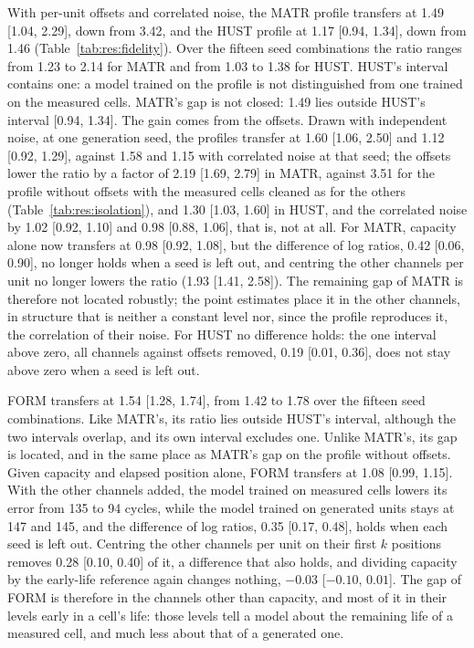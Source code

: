 \documentclass{article}
\begin{document}
With per-unit offsets and correlated noise, the MATR profile transfers at 1.49 [1.04, 2.29], down from 3.42, and the HUST profile at 1.17 [0.94, 1.34], down from 1.46 (Table~\ref{tab:res:fidelity}). Over the fifteen seed combinations the ratio ranges from 1.23 to 2.14 for MATR and from 1.03 to 1.38 for HUST. HUST's interval contains one: a model trained on the profile is not distinguished from one trained on the measured cells. MATR's gap is not closed: 1.49 lies outside HUST's interval [0.94, 1.34]. The gain comes from the offsets. Drawn with independent noise, at one generation seed, the profiles transfer at 1.60 [1.06, 2.50] and 1.12 [0.92, 1.29], against 1.58 and 1.15 with correlated noise at that seed; the offsets lower the ratio by a factor of 2.19 [1.69, 2.79] in MATR, against 3.51 for the profile without offsets with the measured cells cleaned as for the others (Table~\ref{tab:res:isolation}), and 1.30 [1.03, 1.60] in HUST, and the correlated noise by 1.02 [0.92, 1.10] and 0.98 [0.88, 1.06], that is, not at all. For MATR, capacity alone now transfers at 0.98 [0.92, 1.08], but the difference of log ratios, 0.42 [0.06, 0.90], no longer holds when a seed is left out, and centring the other channels per unit no longer lowers the ratio (1.93 [1.41, 2.58]). The remaining gap of MATR is therefore not located robustly; the point estimates place it in the other channels, in structure that is neither a constant level nor, since the profile reproduces it, the correlation of their noise. For HUST no difference holds: the one interval above zero, all channels against offsets removed, 0.19 [0.01, 0.36], does not stay above zero when a seed is left out.

FORM transfers at 1.54 [1.28, 1.74], from 1.42 to 1.78 over the fifteen seed combinations. Like MATR's, its ratio lies outside HUST's interval, although the two intervals overlap, and its own interval excludes one. Unlike MATR's, its gap is located, and in the same place as MATR's gap on the profile without offsets. Given capacity and elapsed position alone, FORM transfers at 1.08 [0.99, 1.15]. With the other channels added, the model trained on measured cells lowers its error from 135 to 94 cycles, while the model trained on generated units stays at 147 and 145, and the difference of log ratios, 0.35 [0.17, 0.48], holds when each seed is left out. Centring the other channels per unit on their first $k$ positions removes 0.28 [0.10, 0.40] of it, a difference that also holds, and dividing capacity by the early-life reference again changes nothing, $-0.03$ [$-0.10$, $0.01$]. The gap of FORM is therefore in the channels other than capacity, and most of it in their levels early in a cell's life: those levels tell a model about the remaining life of a measured cell, and much less about that of a generated one.
\end{document}
